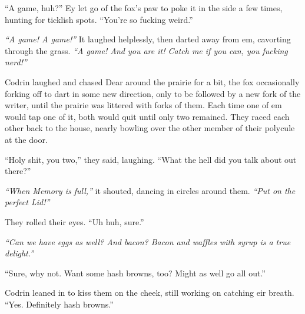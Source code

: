``A game, huh?'' Ey let go of the fox's paw to poke it in the side a few times, hunting for ticklish spots. ``You're so fucking weird.''

\emph{``A game! A game!''} It laughed helplessly, then darted away from em, cavorting through the grass. \emph{``A game! And you are it! Catch me if you can, you fucking nerd!''}

Codrin laughed and chased Dear around the prairie for a bit, the fox occasionally forking off to dart in some new direction, only to be followed by a new fork of the writer, until the prairie was littered with forks of them. Each time one of em would tap one of it, both would quit until only two remained. They raced each other back to the house, nearly bowling over the other member of their polycule at the door.

``Holy shit, you two,'' they said, laughing. ``What the hell did you talk about out there?''

\emph{``When Memory is full,''} it shouted, dancing in circles around them. \emph{``Put on the perfect Lid!''}

They rolled their eyes. ``Uh huh, sure.''

\emph{``Can we have eggs as well? And bacon? Bacon and waffles with syrup is a true delight.''}

``Sure, why not. Want some hash browns, too? Might as well go all out.''

Codrin leaned in to kiss them on the cheek, still working on catching eir breath. ``Yes. Definitely hash browns.''
